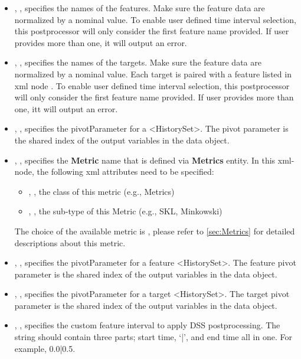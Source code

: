 \begin{itemize}
  \item {}, , specifies the names of the features. Make sure the feature data are normalized by a nominal value.
    To enable user defined time interval selection, this postprocessor will only consider the first feature name provided. If user provides more than one,
    it will output an error.
  \item {}, , specifies the names of the targets. Make sure the feature data are normalized by a nominal value. \nb Each target is paired with a feature listed in xml node .
    To enable user defined time interval selection, this postprocessor will only consider the first feature name provided. If user provides more than one,
    itt will output an error.
  \item {}, , specifies the pivotParameter for a <HistorySet>.
    The pivot parameter is the shared index of the output variables in the data object.
  \item {}, , specifies the \textbf{Metric} name that is defined via
    \textbf{Metrics} entity. In this xml-node, the following xml attributes need to be specified:
    \begin{itemize}
      \item {}, , the class of this metric (e.g., Metrics)
      \item {}, , the sub-type of this Metric (e.g., SKL, Minkowski)
    \end{itemize}
    \nb The choice of the available metric is , please
    refer to \ref{sec:Metrics} for detailed descriptions about this metric.
    \item {}, , specifies the pivotParameter for a feature <HistorySet>. The feature pivot parameter is the shared index of the output variables in the data object.
    \item {}, , specifies the pivotParameter for a target <HistorySet>. The target pivot parameter is the shared index of the output variables in the data object.
    \item {}, , specifies the custom feature interval to apply DSS postprocessing. The string should contain three parts; start time, `|', and end time all in one. For example, 0.0|0.5.

\end{itemize}
